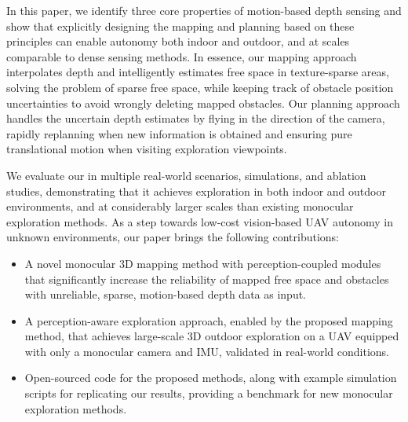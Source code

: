 \documentclass[letterpaper, 10 pt, journal, twoside]{IEEEtran}
\newcommand{\fix}[1]{\hypersetup{allcolors=black}{\color{black} {#1}}}
\begin{document}
{In this paper, we identify three core properties of motion-based depth sensing and show that explicitly designing the mapping and planning based on these principles can enable autonomy both indoor and outdoor, and at scales comparable to dense sensing methods.
In essence, our mapping approach interpolates depth and intelligently estimates free space in texture-sparse areas, solving the problem of sparse free space, while keeping track of obstacle position uncertainties to avoid wrongly deleting mapped obstacles.
Our planning approach handles the uncertain depth estimates by flying in the direction of the camera, rapidly replanning when new information is obtained and ensuring pure translational motion when visiting exploration viewpoints.

We evaluate our \fix{combined mapping and planning approach, dubbed MonoSpheres,} in multiple real-world scenarios, simulations, and ablation studies, demonstrating that it 
achieves exploration in both indoor and outdoor environments, and at considerably larger scales than existing monocular exploration methods.
As a step towards low-cost vision-based UAV autonomy in unknown environments, our paper brings the following contributions:
}

\begin{itemize}
  \item {A novel monocular 3D mapping method with perception-coupled modules that significantly increase the reliability of mapped free space and obstacles with unreliable, sparse, motion-based depth data as input.}
  \item A perception-aware exploration approach, enabled by the proposed mapping method, that achieves large-scale 3D outdoor exploration on a UAV equipped with only a monocular camera and IMU, 
      validated in real-world conditions.
    \item Open-sourced code for the proposed methods, along with example simulation scripts for replicating our results, providing a benchmark for new monocular exploration methods.
\end{itemize}
\end{document}
